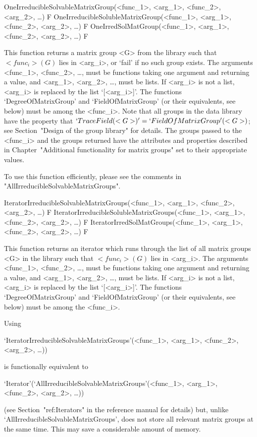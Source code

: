 \>OneIrreducibleSolvableMatrixGroup(<func_1>, <arg_1>, <func_2>, <arg_2>, \dots) F
\>OneIrreducibleSolubleMatrixGroup(<func_1>, <arg_1>, <func_2>, <arg_2>, \dots) F
\>OneIrredSolMatGroup(<func_1>, <arg_1>, <func_2>, <arg_2>, \dots) F

This function returns a matrix group <G> from the {\IRREDSOL} library such that
$<func_i>(G)$ lies in <arg_i>, or `fail' if no such group exists. The arguments <func_1>,
<func_2>, \dots, must be {\GAP} functions taking one argument and returning a value, and
<arg_1>, <arg_2>, \dots,  must be lists. If <arg_i> is not a list, <arg_i> is replaced by
the list `[<arg_i>]'. The functions `DegreeOfMatrixGroup' and `FieldOfMatrixGroup' (or their equivalents, see below) must be among the <func_i>. 
 Note that all groups in the data library have the property that 
$`TraceField(<G>)' = `FieldOfMatrixGroup'(<G>)$; see Section~"Design of the group library" 
for details. 
The groups passed to the <func_i> and the groups returned have the attributes and properties described in 
Chapter~"Additional functionality for matrix groups" set to their appropriate values.

To use this function efficiently, please see the comments in 
"AllIrreducibleSolvableMatrixGroups".


\>IteratorIrreducibleSolvableMatrixGroups(<func_1>, <arg_1>, <func_2>, <arg_2>, \dots) F
\>IteratorIrreducibleSolubleMatrixGroups(<func_1>, <arg_1>, <func_2>, <arg_2>, \dots) F
\>IteratorIrredSolMatGroups(<func_1>, <arg_1>, <func_2>, <arg_2>, \dots) F

This function returns an iterator which runs through the list of all matrix groups <G>
in the  {\IRREDSOL} library such that
$<func_i>(G)$ lies in <arg_i>. The arguments <func_1>, <func_2>, \dots,
must be {\GAP} functions taking one argument and returning a value, and <arg_1>, <arg_2>, \dots, 
must be lists. If <arg_i> is not a list, <arg_i> is replaced by the list `[<arg_i>]'.
The functions `DegreeOfMatrixGroup' and `FieldOfMatrixGroup' (or their equivalents, see below) must be among the <func_i>. 


Using 

`IteratorIrreducibleSolvableMatrixGroups'(<func_1>, <arg_1>, <func_2>, <arg_2>, \dots)) 

is functionally equivalent to 

`Iterator'(`AllIrreducibleSolvableMatrixGroups'(<func_1>, <arg_1>, <func_2>, <arg_2>, \dots))

(see Section~"ref:Iterators" in the {\GAP} reference manual for details) but, unlike `AllIrreducibleSolvableMatrixGroups', does not store all 
relevant matrix groups at the same time. This may save a considerable amount of memory. 


